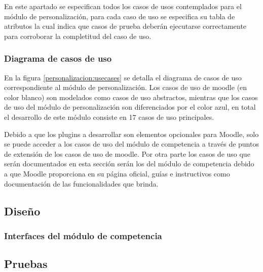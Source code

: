  En este apartado se especifican todos los casos de usos contemplados para el módulo de
 personalización, para cada caso de uso se especifica su tabla de atributos la cual indica que casos
 de prueba deberán ejecutarse correctamente para corroborar la completitud del caso de uso.

\subsubsection*{Diagrama de casos de uso}

 En la figura \ref{personalizacion:usecases} se detalla el diagrama de casos de uso correspondiente al módulo
 de personalización. Los casos de uso de moodle (en color blanco) son modelados como casos de uso
 abstractos, mientras que los casos de uso del módulo de personalización son diferenciados por el
 color azul, en total el desarrollo de este módulo consiste en 17 casos de uso principales.


 \noindent
 Debido a que los plugins a desarrollar son elementos opcionales para Moodle, solo se puede
 acceder a los casos de uso del módulo de competencia a través de puntos de extensión de los
 casos de uso de moodle. Por otra parte los casos de uso que serán documentados en esta sección
 serán los del módulo de competencia debido a que Moodle proporciona en su página oficial, guías
 e instructivos como documentación de las funcionalidades que brinda.



\clearpage
\subsection{Diseño}

\subsubsection{Interfaces del módulo de competencia}

    
    
    
    





\subsection{Pruebas}
